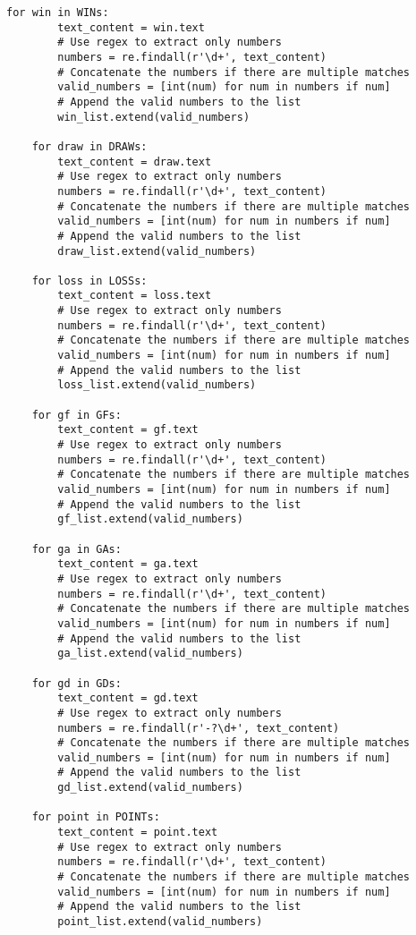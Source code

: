 \begin{lstlisting}[style=pystyle]
    for win in WINs:
        text_content = win.text
        # Use regex to extract only numbers
        numbers = re.findall(r'\d+', text_content)
        # Concatenate the numbers if there are multiple matches
        valid_numbers = [int(num) for num in numbers if num]
        # Append the valid numbers to the list
        win_list.extend(valid_numbers)

    for draw in DRAWs:
        text_content = draw.text
        # Use regex to extract only numbers
        numbers = re.findall(r'\d+', text_content)
        # Concatenate the numbers if there are multiple matches
        valid_numbers = [int(num) for num in numbers if num]
        # Append the valid numbers to the list
        draw_list.extend(valid_numbers)

    for loss in LOSSs:
        text_content = loss.text
        # Use regex to extract only numbers
        numbers = re.findall(r'\d+', text_content)
        # Concatenate the numbers if there are multiple matches
        valid_numbers = [int(num) for num in numbers if num]
        # Append the valid numbers to the list
        loss_list.extend(valid_numbers)

    for gf in GFs:
        text_content = gf.text
        # Use regex to extract only numbers
        numbers = re.findall(r'\d+', text_content)
        # Concatenate the numbers if there are multiple matches
        valid_numbers = [int(num) for num in numbers if num]
        # Append the valid numbers to the list
        gf_list.extend(valid_numbers)

    for ga in GAs:
        text_content = ga.text
        # Use regex to extract only numbers
        numbers = re.findall(r'\d+', text_content)
        # Concatenate the numbers if there are multiple matches
        valid_numbers = [int(num) for num in numbers if num]
        # Append the valid numbers to the list
        ga_list.extend(valid_numbers)

    for gd in GDs:
        text_content = gd.text
        # Use regex to extract only numbers
        numbers = re.findall(r'-?\d+', text_content)
        # Concatenate the numbers if there are multiple matches
        valid_numbers = [int(num) for num in numbers if num]
        # Append the valid numbers to the list
        gd_list.extend(valid_numbers)

    for point in POINTs:
        text_content = point.text
        # Use regex to extract only numbers
        numbers = re.findall(r'\d+', text_content)
        # Concatenate the numbers if there are multiple matches
        valid_numbers = [int(num) for num in numbers if num]
        # Append the valid numbers to the list
        point_list.extend(valid_numbers)


\end{lstlisting}
